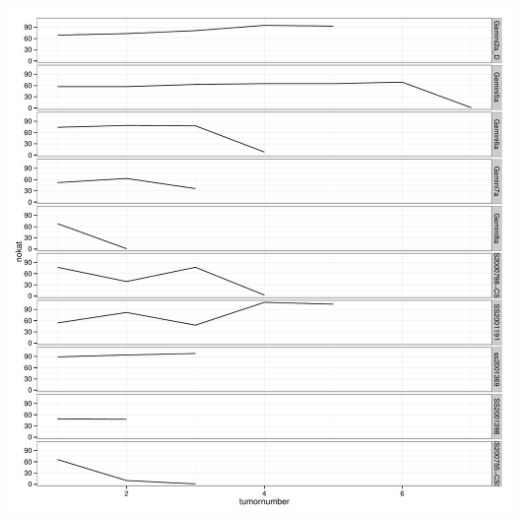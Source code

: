 \documentclass[a4paper,11pt]{article}
\begin{document}
\includegraphics{CLLpilot_rainfallplots_pub-013}
\end{document}
